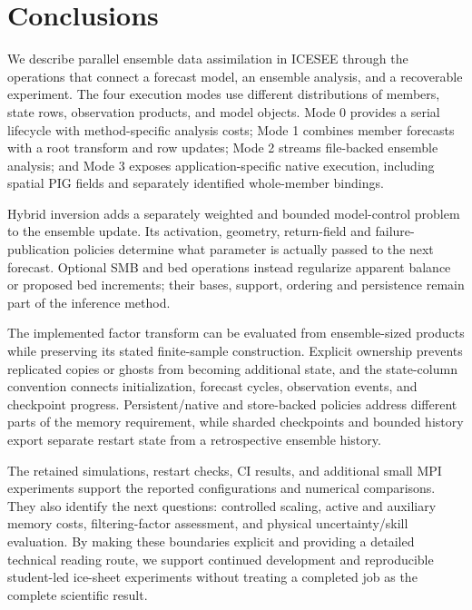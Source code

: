 \documentclass[11pt,a4paper]{article}
\begin{document}
\section{Conclusions}
We describe parallel ensemble data assimilation in ICESEE through the operations that connect a forecast model, an ensemble analysis, and a recoverable experiment. The four execution modes use different distributions of members, state rows, observation products, and model objects. Mode 0 provides a serial lifecycle with method-specific analysis costs; Mode 1 combines member forecasts with a root transform and row updates; Mode 2 streams file-backed ensemble analysis; and Mode 3 exposes application-specific native execution, including spatial PIG fields and separately identified whole-member bindings.

Hybrid inversion adds a separately weighted and bounded model-control problem to the ensemble update. Its activation, geometry, return-field and failure-publication policies determine what parameter is actually passed to the next forecast. Optional SMB and bed operations instead regularize apparent balance or proposed bed increments; their bases, support, ordering and persistence remain part of the inference method.

The implemented factor transform can be evaluated from ensemble-sized products while preserving its stated finite-sample construction. Explicit ownership prevents replicated copies or ghosts from becoming additional state, and the state-column convention connects initialization, forecast cycles, observation events, and checkpoint progress. Persistent/native and store-backed policies address different parts of the memory requirement, while sharded checkpoints and bounded history export separate restart state from a retrospective ensemble history.

The retained simulations, restart checks, CI results, and additional small MPI experiments support the reported configurations and numerical comparisons. They also identify the next questions: controlled scaling, active and auxiliary memory costs, filtering-factor assessment, and physical uncertainty/skill evaluation. By making these boundaries explicit and providing a detailed technical reading route, we support continued development and reproducible student-led ice-sheet experiments without treating a completed job as the complete scientific result.
\end{document}
